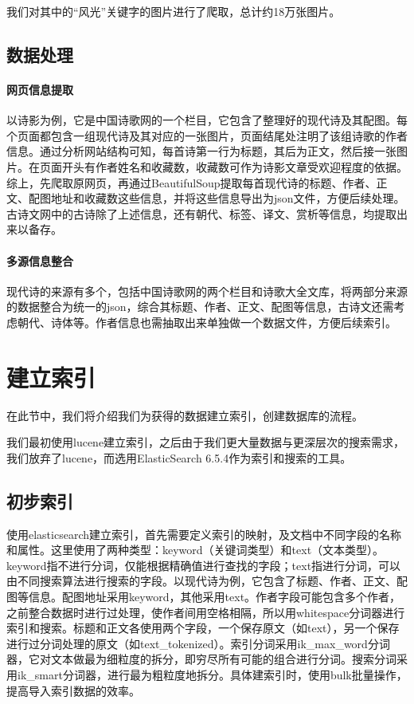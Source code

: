 \documentclass[a4paper, 10pt]{article}
\begin{document}
我们对其中的“风光”关键字的图片进行了爬取，总计约18万张图片。


\subsection{数据处理}
\paragraph{网页信息提取}
以诗影为例，它是中国诗歌网的一个栏目，它包含了整理好的现代诗及其配图。每个页面都包含一组现代诗及其对应的一张图片，页面结尾处注明了该组诗歌的作者信息。通过分析网站结构可知，每首诗第一行为标题，其后为正文，然后接一张图片。在页面开头有作者姓名和收藏数，收藏数可作为诗影文章受欢迎程度的依据。综上，先爬取原网页，再通过BeautifulSoup提取每首现代诗的标题、作者、正文、配图地址和收藏数这些信息，并将这些信息导出为json文件，方便后续处理。古诗文网中的古诗除了上述信息，还有朝代、标签、译文、赏析等信息，均提取出来以备存。

\paragraph{多源信息整合}
现代诗的来源有多个，包括中国诗歌网的两个栏目和诗歌大全文库，将两部分来源的数据整合为统一的json，综合其标题、作者、正文、配图等信息，古诗文还需考虑朝代、诗体等。作者信息也需抽取出来单独做一个数据文件，方便后续索引。

\section{建立索引}
在此节中，我们将介绍我们为获得的数据建立索引，创建数据库的流程。

我们最初使用lucene建立索引，之后由于我们更大量数据与更深层次的搜索需求，我们放弃了lucene，而选用ElasticSearch 6.5.4作为索引和搜索的工具。

\subsection{初步索引}
使用elasticsearch建立索引，首先需要定义索引的映射，及文档中不同字段的名称和属性。这里使用了两种类型：keyword（关键词类型）和text（文本类型）。keyword指不进行分词，仅能根据精确值进行查找的字段；text指进行分词，可以由不同搜索算法进行搜索的字段。以现代诗为例，它包含了标题、作者、正文、配图等信息。配图地址采用keyword，其他采用text。作者字段可能包含多个作者，之前整合数据时进行过处理，使作者间用空格相隔，所以用whitespace分词器进行索引和搜索。标题和正文各使用两个字段，一个保存原文（如text），另一个保存进行过分词处理的原文（如text\_tokenized）。索引分词采用ik\_max\_word分词器，它对文本做最为细粒度的拆分，即穷尽所有可能的组合进行分词。搜索分词采用ik\_smart分词器，进行最为粗粒度地拆分。具体建索引时，使用bulk批量操作，提高导入索引数据的效率。
\end{document}
